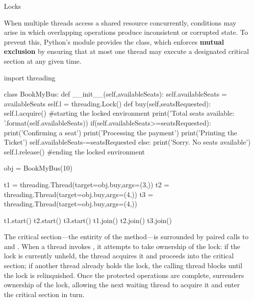 \documentclass[10pt]{article}
\begin{document}
      \begin{core}[label=core:locks]{Locks}

        When multiple threads access a shared resource concurrently, conditions may arise in which overlapping operations produce inconsistent or corrupted state. To prevent this, Python's  module provides the  class, which enforces \textbf{mutual exclusion} by ensuring that at most one thread may execute a designated critical section at any given time.

        \begin{pyconsole}

          import threading

          class BookMyBus:
              def __init__(self,availableSeats):
                  self.availableSeats = availableSeats
                  self.l = threading.Lock()
              def buy(self,seatsRequested):
                  self.l.acquire() #starting the locked environment
                  print('Total seats available: {}'.format(self.availableSeats))
                  if(self.availableSeats>=seatsRequested):
                      print('Confirming a seat')
                      print('Processing the payment')
                      print('Printing the Ticket')
                      self.availableSeats-=seatsRequested
                  else:
                      print('Sorry. No seats available')
                  self.l.release() #ending the locked environment

          obj = BookMyBus(10)

          t1 = threading.Thread(target=obj.buy,args=(3,))
          t2 = threading.Thread(target=obj.buy,args=(4,))
          t3 = threading.Thread(target=obj.buy,args=(4,))

          t1.start()
          t2.start()
          t3.start()
          t1.join()
          t2.join()
          t3.join()

        \end{pyconsole}

        The critical section---the entirity of the  method---is surrounded by paired calls to  and . When a thread invokes , it attempts to take ownership of the lock: if the lock is currently unheld, the thread acquires it and proceeds into the critical section; if another thread already holds the lock, the calling thread blocks until the lock is relinquished. Once the protected operations are complete,  surrenders ownership of the lock, allowing the next waiting thread to acquire it and enter the critical section in turn.

      \end{core}
\end{document}
